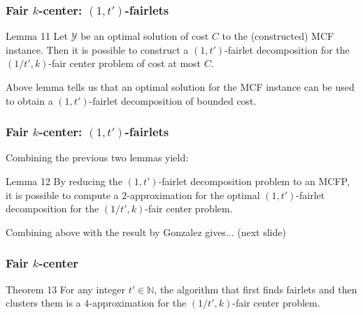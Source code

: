 \documentclass{beamer}
\begin{document}

\begin{frame}
\frametitle{Fair $k$-center: $(1, t')$-fairlets}

\begin{block}{Lemma 11}
Let $\mathcal{Y}$ be an optimal solution of cost $C$ to the (constructed) MCF instance. Then it is possible to construct a $(1, t')$-fairlet decomposition for the $(1/t', k)$-fair center problem of cost at most $C$.

\end{block}

Above lemma tells us that an optimal solution for the MCF instance can be used to obtain a $(1, t')$-fairlet decomposition of bounded cost.

\end{frame}


\begin{frame}
\frametitle{Fair $k$-center: $(1, t')$-fairlets}

Combining the previous two lemmas yield:
 
\begin{block}{Lemma 12}
By reducing the $(1, t')$-fairlet decomposition problem to an MCFP, it is possible to compute a $2$-approximation for the optimal $(1, t')$-fairlet decomposition for the $(1/t', k)$-fair center problem.
\end{block}

Combining above with the result by Gonzalez gives... (next slide)

\end{frame}



\begin{frame}
\frametitle{Fair $k$-center}

\begin{block}{Theorem 13}
For any integer $t' \in \mathbb{N}$, the algorithm that first finds fairlets and then clusters them is a \alert{$4$-approximation} for the $(1/t', k)$-fair center problem.

\end{block}

\end{frame}
\end{document}
